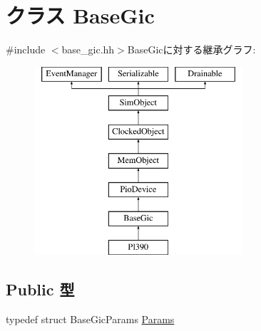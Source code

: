 \hypertarget{classBaseGic}{
\section{クラス BaseGic}
\label{classBaseGic}
}


{\ttfamily \#include $<$base\_\-gic.hh$>$}BaseGicに対する継承グラフ:\begin{figure}[H]
\begin{center}
\leavevmode
\includegraphics[height=7cm]{classBaseGic}
\end{center}
\end{figure}
\subsection*{Public 型}
\begin{DoxyCompactItemize}
\item 
typedef struct BaseGicParams \hyperlink{classBaseGic_aacf2140b95fc8c326a11f01521f5018d}{Params}
\end{DoxyCompactItemize}
